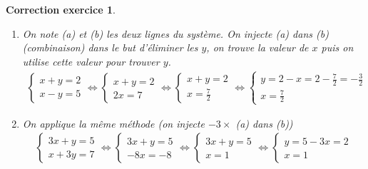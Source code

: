 \documentclass[12pt]{article}
\newtheorem{correction}{\bf Correction exercice}
\newenvironment{cor}{
\begin{correction}\smallskip\normalfont}{\end{correction}
}
\newif\ifcorrige\corrigefalse
\begin{document}
\ifcorrige
\color{magenta}
\begin{cor}
  $\qquad$
\begin{enumerate}
\item On note (a) et (b) les deux lignes du syst\`eme.
  On injecte (a) dans (b) (combinaison) dans le but d'\'eliminer les $y$,
  on trouve la valeur de $x$ puis
  on utilise cette valeur pour trouver $y$.
  \begin{align*}
    \left\{
      \begin{array}{l}
        x + y = 2
        \\
        x - y = 5
      \end{array}
    \right.
    \iff
    \left\{
      \begin{array}{l}
        x + y = 2
        \\
        2x = 7
      \end{array}
    \right.
    \iff
    \left\{
      \begin{array}{l}
        x + y = 2
        \\
        x = \frac72
      \end{array}
    \right.
    \iff
    \left\{
      \begin{array}{l}
        y = 2 - x = 2 - \frac72 = - \frac32
        \\
        x = \frac72
      \end{array}
    \right.
  \end{align*}
\item
  On applique la m\^eme m\'ethode (on injecte $-3 \times$ (a) dans (b))
  \begin{align*}
    \left\{
      \begin{array}{l}
        3x + y = 5
        \\
        x + 3y = 7
      \end{array}
    \right.
    \iff
    \left\{
      \begin{array}{l}
        3x + y = 5
        \\
        -8x  = -8
      \end{array}
    \right.
    \iff
    \left\{
      \begin{array}{l}
        3x + y = 5
        \\
        x  = 1
      \end{array}
    \right.
    \iff
    \left\{
      \begin{array}{l}
        y = 5 -3x = 2
        \\
        x  = 1
      \end{array}

\end{align*}
\end{enumerate}
\end{cor}
\end{document}
